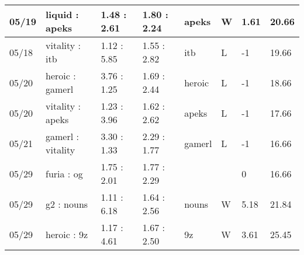 \begin{small}
\begin{longtable}{|l|l|l|l|l|l|l|l|}
	05/19                               & liquid : apeks                      & 1.48 : 2.61                             & 1.80 : 2.24                             & apeks                             & W                                 & 1.61                                 & 20.66                             \\ \hline
	05/18                               & vitality : itb                      & 1.12 : 5.85                             & 1.55 : 2.82                             & itb                               & L                                 & -1                                   & 19.66                             \\ \hline
	05/20                               & heroic : gamerl                     & 3.76 : 1.25                             & 1.69 : 2.44                             & heroic                            & L                                 & -1                                   & 18.66                             \\ \hline
	05/20                               & vitality : apeks                    & 1.23 : 3.96                             & 1.62 : 2.62                             & apeks                             & L                                 & -1                                   & 17.66                             \\ \hline
	05/21                               & gamerl : vitality                   & 3.30 : 1.33                             & 2.29 : 1.77                             & gamerl                            & L                                 & -1                                   & 16.66                             \\ \hline
	05/29                               & furia : og                          & 1.75 : 2.01                             & 1.77 : 2.29                             &                                   &                                   & 0                                    & 16.66                             \\ \hline
	05/29                               & g2 : nouns                          & 1.11 : 6.18                             & 1.64 : 2.56                             & nouns                             & W                                 & 5.18                                 & 21.84                             \\ \hline
	05/29                               & heroic : 9z                         & 1.17 : 4.61                             & 1.67 : 2.50                             & 9z                                & W                                 & 3.61                                 & 25.45                             \\ \hline

\end{longtable}
\end{small}
